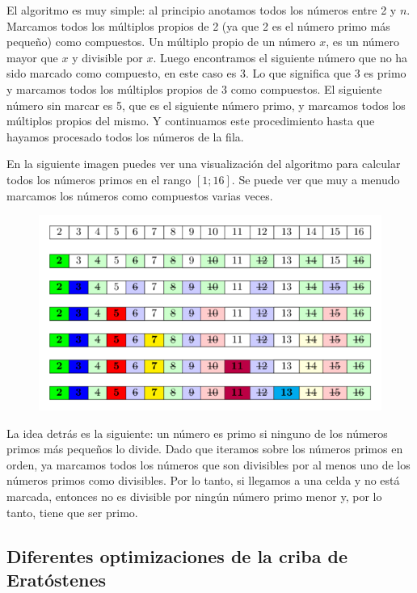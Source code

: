 El algoritmo es muy simple: al principio anotamos todos los números entre 2 y $n$. Marcamos todos los 
múltiplos propios de 2 (ya que 2 es el número primo más pequeño) como compuestos. Un múltiplo propio 
de un número $x$, es un número mayor que $x$ y divisible por $x$. Luego encontramos el siguiente 
número que no ha sido marcado como compuesto, en este caso es 3. Lo que significa que 3 es primo y 
marcamos todos los múltiplos propios de 3 como compuestos. El siguiente número sin marcar es 5, que 
es el siguiente número primo, y marcamos todos los múltiplos propios del mismo. Y continuamos este 
procedimiento hasta que hayamos procesado todos los números de la fila.

En la siguiente imagen puedes ver una visualización del algoritmo para calcular todos los números primos en el rango $[1; 16]$. Se puede ver que muy a menudo marcamos los números como compuestos varias veces.

\begin{figure}[h!]
	\centering
	\includegraphics[width=1\linewidth]{img/sieve_eratosthenes}

	\label{fig:sieveeratosthenes}
\end{figure}


La idea detrás es la siguiente: un número es primo si ninguno de los números primos más pequeños lo divide. Dado que iteramos sobre los números primos en orden, ya marcamos todos los números que son divisibles por al menos uno de los números primos como divisibles. Por lo tanto, si llegamos a una celda y no está marcada, entonces no es divisible por ningún número primo menor y, por lo tanto, tiene que ser primo.


\subsection{Diferentes optimizaciones de la criba de  Eratóstenes}

